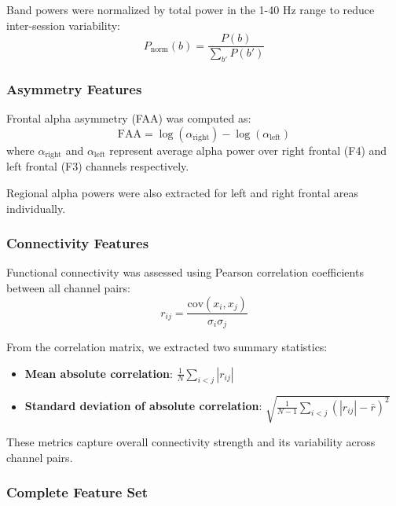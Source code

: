 Band powers were normalized by total power in the 1-40 Hz range to reduce inter-session variability:
\begin{equation}
P_{\text{norm}}(b) = \frac{P(b)}{\sum_{b'} P(b')}
\end{equation}

\subsubsection{Asymmetry Features}

Frontal alpha asymmetry (FAA) was computed as:
\begin{equation}
\text{FAA} = \log(\alpha_{\text{right}}) - \log(\alpha_{\text{left}})
\end{equation}
where $\alpha_{\text{right}}$ and $\alpha_{\text{left}}$ represent average alpha power over right frontal (F4) and left frontal (F3) channels respectively.

Regional alpha powers were also extracted for left and right frontal areas individually.

\subsubsection{Connectivity Features}

Functional connectivity was assessed using Pearson correlation coefficients between all channel pairs:
\begin{equation}
r_{ij} = \frac{\text{cov}(x_i, x_j)}{\sigma_i \sigma_j}
\end{equation}

From the correlation matrix, we extracted two summary statistics:
\begin{itemize}
    \item \textbf{Mean absolute correlation}: $\frac{1}{N} \sum_{i<j} |r_{ij}|$
    \item \textbf{Standard deviation of absolute correlation}: $\sqrt{\frac{1}{N-1} \sum_{i<j} (|r_{ij}| - \bar{r})^2}$
\end{itemize}

These metrics capture overall connectivity strength and its variability across channel pairs.

\subsubsection{Complete Feature Set}

